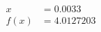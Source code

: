 \documentclass[preview]{standalone}
\begin{document}
\begin{align*}
x &= 0.0033\\f(x) &= 4.0127203
\end{align*}
\end{document}
